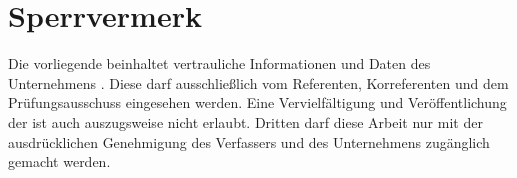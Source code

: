 \chapter*{Sperrvermerk}
Die vorliegende \insertDokumentenart beinhaltet vertrauliche
Informationen und Daten des Unternehmens \insertUnternehmen.
Diese \insertDokumentenart darf ausschließlich vom Referenten,
Korreferenten und dem Prüfungsausschuss eingesehen
werden. Eine Vervielfältigung und Veröffentlichung der
\insertDokumentenart ist auch auszugsweise nicht erlaubt.
Dritten darf diese Arbeit nur mit der ausdrücklichen
Genehmigung des Verfassers und des Unternehmens
zugänglich gemacht werden.